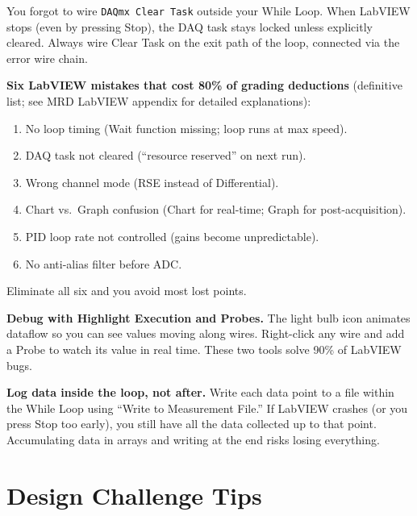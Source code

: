 \documentclass[11pt,letterpaper]{article}
\begin{document}
\begin{faqbox}
You forgot to wire \texttt{DAQmx Clear Task} outside your While Loop. When LabVIEW stops (even by pressing Stop), the DAQ task stays locked unless explicitly cleared. Always wire Clear Task on the exit path of the loop, connected via the error wire chain.
\end{faqbox}

\begin{warnbox}
\textbf{Six LabVIEW mistakes that cost 80\% of grading deductions} (definitive list; see MRD LabVIEW appendix for detailed explanations):
\begin{enumerate}[nosep,leftmargin=*]
\item No loop timing (Wait function missing; loop runs at max speed).
\item DAQ task not cleared (``resource reserved'' on next run).
\item Wrong channel mode (RSE instead of Differential).
\item Chart vs.\ Graph confusion (Chart for real-time; Graph for post-acquisition).
\item PID loop rate not controlled (gains become unpredictable).
\item No anti-alias filter before ADC.
\end{enumerate}
Eliminate all six and you avoid most lost points.
\end{warnbox}

\begin{tipbox}
\textbf{Debug with Highlight Execution and Probes.} The light bulb icon animates dataflow so you can see values moving along wires. Right-click any wire and add a Probe to watch its value in real time. These two tools solve 90\% of LabVIEW bugs.
\end{tipbox}

\begin{protip}
\textbf{Log data inside the loop, not after.} Write each data point to a file within the While Loop using ``Write to Measurement File.'' If LabVIEW crashes (or you press Stop too early), you still have all the data collected up to that point. Accumulating data in arrays and writing at the end risks losing everything.
\end{protip}

\section{Design Challenge Tips}
\end{document}
